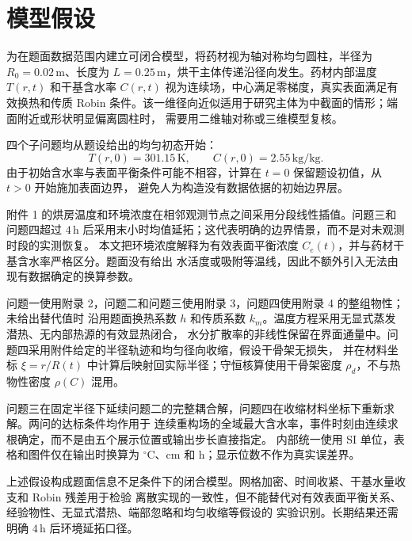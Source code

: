 \section{模型假设}

为在题面数据范围内建立可闭合模型，将药材视为轴对称均匀圆柱，半径为
$R_0=0.02\,\mathrm m$、长度为 $L=0.25\,\mathrm m$，烘干主体传递沿径向发生。药材内部温度
$T(r,t)$ 和干基含水率 $C(r,t)$ 视为连续场，中心满足零梯度，真实表面满足有效换热和传质
Robin 条件。该一维径向近似适用于研究主体为中截面的情形；端面附近或形状明显偏离圆柱时，
需要用二维轴对称或三维模型复核。

四个子问题均从题设给出的均匀初态开始：
\[
T(r,0)=301.15\,\mathrm K,\qquad C(r,0)=2.55\,\mathrm{kg/kg}.
\]
由于初始含水率与表面平衡条件可能不相容，计算在 $t=0$ 保留题设初值，从 $t>0$ 开始施加表面边界，
避免人为构造没有数据依据的初始边界层。

附件 1 的烘房温度和环境浓度在相邻观测节点之间采用分段线性插值。问题三和问题四超过
$4\,\mathrm h$ 后采用末小时均值延拓；这代表明确的边界情景，而不是对未观测时段的实测恢复。
本文把环境浓度解释为有效表面平衡浓度 $C_e(t)$，并与药材干基含水率严格区分。题面没有给出
水活度或吸附等温线，因此不额外引入无法由现有数据确定的换算参数。

问题一使用附录 2，问题二和问题三使用附录 3，问题四使用附录 4 的整组物性；未给出替代值时
沿用题面换热系数 $h$ 和传质系数 $k_m$。温度方程采用无显式蒸发潜热、无内部热源的有效显热闭合，
水分扩散率的非线性保留在界面通量中。问题四采用附件给定的半径轨迹和均匀径向收缩，假设干骨架无损失，
并在材料坐标 $\xi=r/R(t)$ 中计算后映射回实际半径；守恒核算使用干骨架密度 $\rho_d$，不与热物性密度
$\rho(C)$ 混用。

问题三在固定半径下延续问题二的完整耦合解，问题四在收缩材料坐标下重新求解。两问的达标条件均作用于
连续重构场的全域最大含水率，事件时刻由连续求根确定，而不是由五个展示位置或输出步长直接指定。
内部统一使用 SI 单位，表格和图件仅在输出时换算为 $\mathrm{^\circ C}$、cm 和 h；显示位数不作为真实误差界。

上述假设构成题面信息不足条件下的闭合模型。网格加密、时间收紧、干基水量收支和 Robin 残差用于检验
离散实现的一致性，但不能替代对有效表面平衡关系、经验物性、无显式潜热、端部忽略和均匀收缩等假设的
实验识别。长期结果还需明确 $4\,\mathrm h$ 后环境延拓口径。
